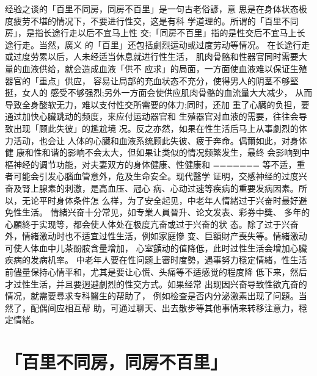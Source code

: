 \documentclass[12pt,UTF8]{ctexbook}
\begin{document}
经验之谈的「百里不同房，同房不百里」是一句古老俗諺，意
思是在身体状态极度疲劳不堪的情况下，不要进行性交，这是有科
学道理的。所谓的「百里不同房」，是指长途行走以后不宜马上性
交;「同房不百里」指的是性交后不宜马上长途行走。当然，廣义
的「百里」还包括劇烈运动或过度劳动等情况。
在长途行走或过度劳累以后，人未经适当休息就进行性生活，
肌肉骨骼和性器官同时需要大量的血液供给，就会造成血液「供不
应求」的局面，一方面使血液难以保证生殖器官的「重点」供应，
容易让局部的充血状态不充分，使得男人的阴茎不够堅挺，女人的
感受不够强烈;另外一方面会使供应肌肉骨骼的血流量大大减少，
从而导致全身酸软无力，难以支付性交所需要的体力;同时，还加
重了心臟的负担，要通过加快心臟跳动的频度，来应付运动器官和
生殖器官对血液的需要，往往会导致出现「顾此失彼」的尷尬境
况。反之亦然，如果在性生活后马上从事劇烈的体力活动，也会让
人体的心臟和血液系统顾此失彼、疲于奔命。偶爾如此，对身体健
康和性和谐的影响不会太大，但如果让类似的情况频繁发生，最终
会影响到中樞神经的调节功能，对夫妻双方的身体健康、性健康和
=======
等不适，重者可能会引发心腦血管意外，危及生命安全。现代醫学
证明，交感神经的过度兴奋及腎上腺素的刺激，是高血压、冠心
病、心动过速等疾病的重要发病因素。所以，无论平时身体条件怎
么样，为了安全起见，中老年人情緒过于兴奋时最好避免性生活。
情緒兴奋十分常见，如专業人員晉升、论文发表、彩券中獎、
多年的心願終于实现等，都会使人体处在极度亢奋或过于兴奋的状
态。除了过于兴奋外，情緒激动时也不适宜过性生活，例如家庭慘
变、巨額財产喪失等。情緒激动可使人体血中儿茶酚胺含量增加，
心室顫动的值降低，此时过性生活会增加心臟疾病的发病机率。
中老年人要在性问题上審时度勢，遇事努力穩定情緒，性生活
前儘量保持心情平和，尤其是要让心慌、头痛等不适感觉的程度降
低下来，然后才过性生活，并且要迥避劇烈的性交方式。如果经常
出现因兴奋导致性欲亢奋的情况，就需要尋求专科醫生的帮助了，
例如检查是否内分泌激素出现了问題。当然了，配偶间应相互帮
助，可通过聊天、出去散步等其他事情来转移注意力，穩定情緒。

\section{「百里不同房，同房不百里」}
\end{document}
